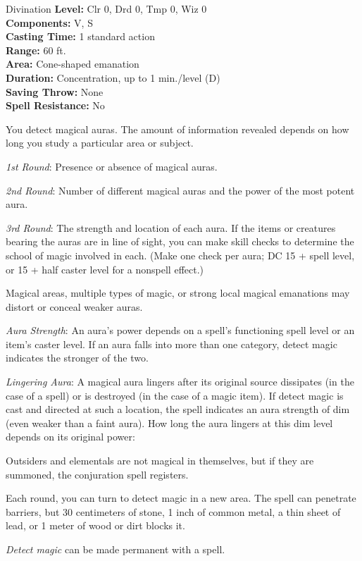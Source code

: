 {Divination}
{
	\textbf{Level:}
	Clr 0, Drd 0, Tmp 0, Wiz 0\\
	\textbf{Components:}
	V, S\\
	\textbf{Casting Time:}
	1 standard action\\
	\textbf{Range:}
	60 ft.\\
	\textbf{Area:}
	Cone-shaped emanation\\
	\textbf{Duration:}
	Concentration, up to 1 min./level (D)\\
	\textbf{Saving Throw:}
	None\\
	\textbf{Spell Resistance:}
	No\\
}
{
	You detect magical auras. The amount of information revealed depends on how long you study a particular area or subject.

	\textit{1st Round}:
	Presence or absence of magical auras.

	\textit{2nd Round}:
	Number of different magical auras and the power of the most potent aura.

	\textit{3rd Round}:
	The strength and location of each aura. If the items or creatures bearing the auras are in line of sight, you can make  skill checks to determine the school of magic involved in each. (Make one check per aura; DC 15 + spell level, or 15 + half caster level for a nonspell effect.)

	Magical areas, multiple types of magic, or strong local magical emanations may distort or conceal weaker auras.

	\textit{Aura Strength}:
	An aura's power depends on a spell's functioning spell level or an item's caster level. If an aura falls into more than one category, detect magic indicates the stronger of the two.

	\textit{Lingering Aura}:
	A magical aura lingers after its original source dissipates (in the case of a spell) or is destroyed (in the case of a magic item). If detect magic is cast and directed at such a location, the spell indicates an aura strength of dim (even weaker than a faint aura). How long the aura lingers at this dim level depends on its original power:


	Outsiders and elementals are not magical in themselves, but if they are summoned, the conjuration spell registers.

	Each round, you can turn to detect magic in a new area. The spell can penetrate barriers, but 30 centimeters of stone, 1 inch of common metal, a thin sheet of lead, or 1 meter of wood or dirt blocks it.

	\emph{Detect magic} can be made permanent with a  spell.

}
